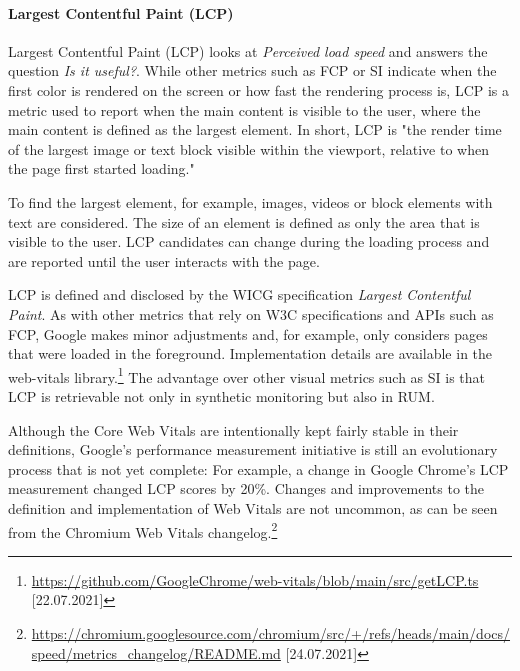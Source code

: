 
\paragraph{Largest Contentful Paint (LCP)} %


Largest Contentful Paint (LCP) looks at \textit{Perceived load speed} and answers the question \textit{Is it useful?}.
While other metrics such as FCP or SI indicate when the first color is rendered on the screen or how fast the rendering process is, LCP is a metric used to report when the main content is visible to the user, where the main content is defined as the largest element.
In short, LCP is "the render time of the largest image or text block visible within the viewport, relative to when the page first started loading." %

To find the largest element, for example, images, videos or block elements with text are considered.
The size of an element is defined as only the area that is visible to the user.
LCP candidates can change during the loading process and are reported until the user interacts with the page.

LCP is defined and disclosed by the WICG specification \textit{Largest Contentful Paint}.
As with other metrics that rely on W3C specifications and APIs such as FCP, Google makes minor adjustments and, for example, only considers pages that were loaded in the foreground.
Implementation details are available in the web-vitals library.\footnote{\url{https://github.com/GoogleChrome/web-vitals/blob/main/src/getLCP.ts} [22.07.2021]}
The advantage over other visual metrics such as SI is that LCP is retrievable not only in synthetic monitoring but also in RUM.


Although the Core Web Vitals are intentionally kept fairly stable in their definitions, Google's performance measurement initiative is still an evolutionary process that is not yet complete:
For example, a change in Google Chrome's LCP measurement changed LCP scores by 20\%. %
Changes and improvements to the definition and implementation of Web Vitals are not uncommon, as can be seen from the Chromium Web Vitals changelog.\footnote{\url{https://chromium.googlesource.com/chromium/src/+/refs/heads/main/docs/speed/metrics_changelog/README.md} [24.07.2021]}

